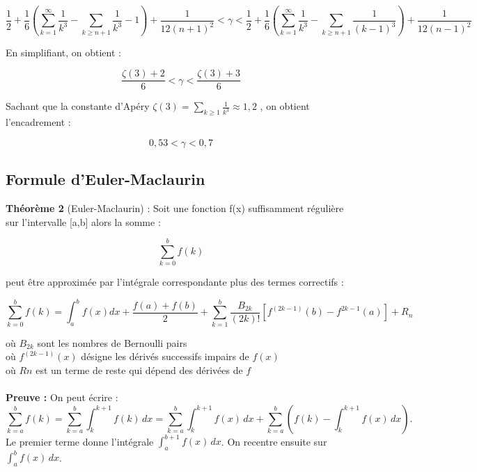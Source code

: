 \documentclass[a4paper,12pt]{article}
\begin{document}
\[ \frac{1}{2} + \frac{1}{6} (\sum_{k=1}^{\infty} \frac{1}{k^{3}}  - \sum_{k \geq n+1}\frac{1}{k^3} - 1 )+ \frac{1}{12(n+1)^{2}} < \gamma < \frac{1}{2} + \frac{1}{6}( \sum_{k=1}^{\infty} \frac{1}{k^{3}} - \sum_{k \geq n+1}\frac{1}{(k-1)^3}) + \frac{1}{12(n-1)^{2}}\]

En simplifiant, on obtient :

\[ 
\frac{\zeta(3) + 2}{6} < \gamma < \frac{\zeta(3)+3}{6}
\]

Sachant que la constante d'Apéry $\zeta(3) = \sum_{k \geq 1}\frac{1}{k^3} \approx 1,2$ , on obtient l'encadrement :

\[0,53 < \gamma < 0,7\]

\subsection{Formule d'Euler-Maclaurin}

    \textbf{Théorème 2 }(Euler-Maclaurin) : Soit une fonction f(x) suffisamment régulière sur l'intervalle [a,b] alors la somme :
        
           \[ \sum_{k=0}^{b} f(k)\]
       
        peut être approximée par l'intégrale correspondante plus des termes correctifs : 
        
            \[\sum_{k=0}^{b} f(k) = \int_a^b f(x)dx + \frac{f(a)+f(b)}{2} + \sum_{k=1}^{b} \frac{B_{2k}}{(2k)!}\left[f^{(2k-1)}(b) - f^{2k-1}(a)\right] + R_n\]
        
        où \( B_{2k} \) sont les nombres de Bernoulli pairs \\
        où \( f^{(2k-1)}(x)\)  désigne les dérivés successifs impairs de \( f(x)\) \\
        où \( Rn \) est un terme de reste qui dépend des dérivées de \( f \) \\\\

\textbf{Preuve :} On peut écrire :
        \[
        \sum_{k=a}^{b} f(k) = \sum_{k=a}^{b} \int_k^{k+1} f(k) \, dx = \sum_{k=a}^{b} \int_k^{k+1} f(x) \, dx + \sum_{k=a}^{b} \left(f(k) - \int_k^{k+1} f(x)\, dx\right).
        \]
        Le premier terme donne l’intégrale $\int_a^{b+1} f(x)\, dx$. On recentre ensuite sur $\int_a^b f(x)\, dx$.
        
\end{document}
